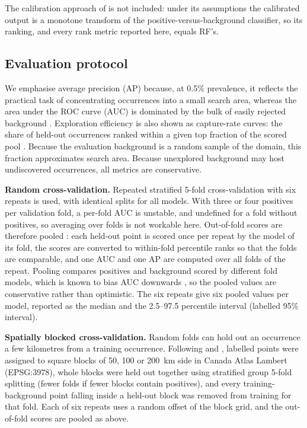 \documentclass[pdflatex,sn-apa]{sn-jnl}
\begin{document}
The calibration approach of \citet{Elkan2008} is not included: under its assumptions the calibrated output is a monotone transform of the positive-versus-background classifier, so its ranking, and every rank metric reported here, equals RF's.

\subsection{Evaluation protocol}\label{sec:protocol}

We emphasise average precision (AP) because, at 0.5\% prevalence, it reflects the practical task of concentrating occurrences into a small search area, whereas the area under the ROC curve (AUC) is dominated by the bulk of easily rejected background \citep{Saito2015}. Exploration efficiency is also shown as capture-rate curves: the share of held-out occurrences ranked within a given top fraction of the scored pool \citep{Chung2003,Agterberg2005}. Because the evaluation background is a random sample of the domain, this fraction approximates search area. Because unexplored background may host undiscovered occurrences, all metrics are conservative.

\textbf{Random cross-validation.} Repeated stratified 5-fold cross-validation with six repeats is used, with identical splits for all models. With three or four positives per validation fold, a per-fold AUC is unstable, and undefined for a fold without positives, so averaging over folds is not workable here. Out-of-fold scores are therefore pooled \citep{BradleyAP1997}: each held-out point is scored once per repeat by the model of its fold, the scores are converted to within-fold percentile ranks so that the folds are comparable, and one AUC and one AP are computed over all folds of the repeat. Pooling compares positives and background scored by different fold models, which is known to bias AUC downwards \citep{Airola2019,Parker2007}, so the pooled values are conservative rather than optimistic. The six repeats give six pooled values per model, reported as the median and the 2.5--97.5 percentile interval (labelled 95\% interval).

\textbf{Spatially blocked cross-validation.} Random folds can hold out an occurrence a few kilometres from a training occurrence. Following \citet{Roberts2017} and \citet{Valavi2019}, labelled points were assigned to square blocks of 50, 100 or 200~km side in Canada Atlas Lambert (EPSG:3978), whole blocks were held out together using stratified group 5-fold splitting (fewer folds if fewer blocks contain positives), and every training-background point falling inside a held-out block was removed from training for that fold. Each of six repeats uses a random offset of the block grid, and the out-of-fold scores are pooled as above.
\end{document}
